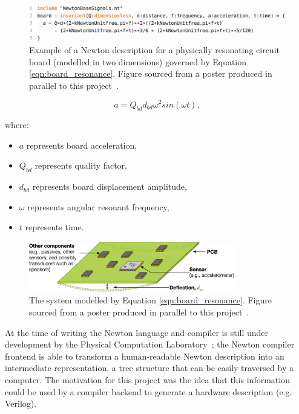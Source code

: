 \documentclass[12pt]{article}
\begin{document}
    \begin{figure}[H]
      \centering
      \includegraphics[width=\textwidth]{fig/newton_description.png}
      \caption{Example of a Newton description for a physically resonating circuit board (modelled in two dimensions) governed by Equation \ref{eqn:board_resonance}. Figure sourced from a poster produced in parallel to this project~\cite{eurosys_poster}.}
      \label{fig:newton_description}
    \end{figure}

    \begin{equation}
      a = Q_{bd} d_{bd} \omega^2sin(\omega t),
      \label{eqn:board_resonance}
    \end{equation}

    where:
    \begin{itemize}
      \item $a$ represents board acceleration,
      \item $Q_{bd}$ represents quality factor,
      \item $d_{bd}$ represents board displacement amplitude,
      \item $\omega$ represents angular resonant frequency,
      \item $t$ represents time.
    \end{itemize}

    \begin{figure}[H]
      \centering
      \includegraphics[width=0.8\textwidth]{fig/resonating_board.png}
      \caption{The system modelled by Equation \ref{eqn:board_resonance}. Figure sourced from a poster produced in parallel to this project~\cite{eurosys_poster}.}
      \label{fig:resonating_board}
    \end{figure}

    At the time of writing the Newton language and compiler is still under development by the Physical Computation Laboratory~\cite{physcomp}; the Newton compiler frontend is able to transform a human-readable Newton description into an intermediate representation, a tree structure that can be easily traversed by a computer. The motivation for this project was the idea that this information could be used by a compiler backend to generate a hardware description (e.g. Verilog).\\
\end{document}
